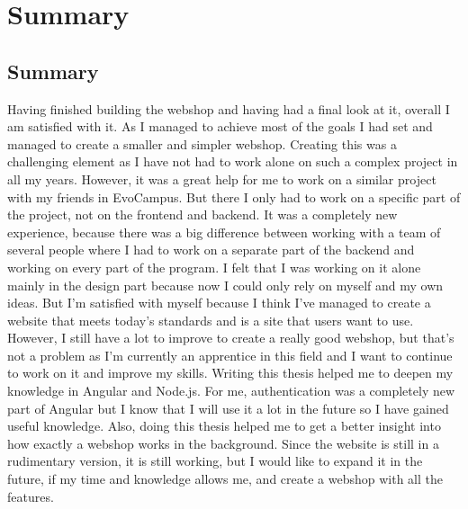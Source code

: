 \chapter{Summary}
\section{Summary}
Having finished building the webshop and having had a final look at it, overall I am satisfied with it. As I managed to achieve most of the goals I had set and managed to create a smaller and simpler webshop. Creating this was a challenging element as I have not had to work alone on such a complex project in all my years. However, it was a great help for me to work on a similar project with my friends in EvoCampus. But there I only had to work on a specific part of the project, not on the frontend and backend. It was a completely new experience, because there was a big difference between working with a team of several people where I had to work on a separate part of the backend and working on every part of the program. I felt that I was working on it alone mainly in the design part because now I could only rely on myself and my own ideas. But I'm satisfied with myself because I think I've managed to create a website that meets today's standards and is a site that users want to use. However, I still have a lot to improve to create a really good webshop, but that's not a problem as I'm currently an apprentice in this field and I want to continue to work on it and improve my skills. Writing this thesis helped me to deepen my knowledge in Angular and Node.js. For me, authentication was a completely new part of Angular but I know that I will use it a lot in the future so I have gained useful knowledge. Also, doing this thesis helped me to get a better insight into how exactly a webshop works in the background. Since the website is still in a rudimentary version, it is still working, but I would like to expand it in the future, if my time and knowledge allows me, and create a webshop with all the features.
